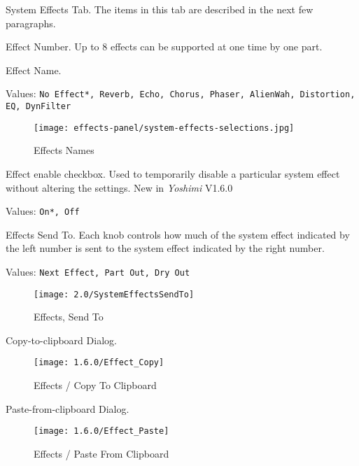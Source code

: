    \setcounter{ItemCounter}{0}      %

   System Effects Tab.
   The items in this tab are described in the next few paragraphs.

   Effect Number.
   Up to 8 effects can be supported at one time by one part.

   Effect Name.

   Values: \texttt{No Effect*, Reverb, Echo, Chorus, Phaser, AlienWah,
      Distortion, EQ, DynFilter}

\begin{figure}[H]
   \centering
   \texttt{[image: effects-panel/system-effects-selections.jpg]}
   \caption{Effects Names}
   \label{fig:effects_names}
\end{figure}

   Effect enable checkbox. Used to temporarily disable a particular system
   effect without altering the settings. New in \textsl{Yoshimi} V1.6.0

   Values: \texttt{On*, Off}

   Effects Send To.
   Each knob controls how much of the system effect indicated by the left
   number is sent to the system effect indicated by the right number.

   Values: \texttt{Next Effect, Part Out, Dry Out}

\begin{figure}[H]
   \centering
   \texttt{[image: 2.0/SystemEffectsSendTo]}
   \caption{Effects, Send To}
   \label{fig:effects_send_to}
\end{figure}

   Copy-to-clipboard Dialog.

\begin{figure}[H]
   \centering
   \texttt{[image: 1.6.0/Effect\_Copy]}
   \caption{Effects / Copy To Clipboard}
   \label{fig:effects_copy_to_clipboard}
\end{figure}

   Paste-from-clipboard Dialog.

\begin{figure}[H]
   \centering
   \texttt{[image: 1.6.0/Effect\_Paste]}
   \caption{Effects / Paste From Clipboard}
   \label{fig:effects_paste_from_clipboard}
\end{figure}

